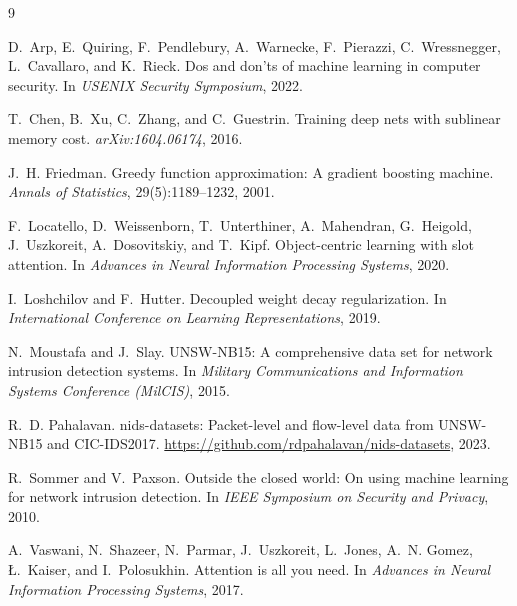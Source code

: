 \documentclass[11pt]{article}
\begin{document}

\begin{thebibliography}{9}

D.~Arp, E.~Quiring, F.~Pendlebury, A.~Warnecke, F.~Pierazzi, C.~Wressnegger,
L.~Cavallaro, and K.~Rieck.
\newblock Dos and don'ts of machine learning in computer security.
\newblock In \emph{USENIX Security Symposium}, 2022.

T.~Chen, B.~Xu, C.~Zhang, and C.~Guestrin.
\newblock Training deep nets with sublinear memory cost.
\newblock \emph{arXiv:1604.06174}, 2016.

J.~H. Friedman.
\newblock Greedy function approximation: A gradient boosting machine.
\newblock \emph{Annals of Statistics}, 29(5):1189--1232, 2001.

F.~Locatello, D.~Weissenborn, T.~Unterthiner, A.~Mahendran, G.~Heigold,
J.~Uszkoreit, A.~Dosovitskiy, and T.~Kipf.
\newblock Object-centric learning with slot attention.
\newblock In \emph{Advances in Neural Information Processing Systems}, 2020.

I.~Loshchilov and F.~Hutter.
\newblock Decoupled weight decay regularization.
\newblock In \emph{International Conference on Learning Representations}, 2019.

N.~Moustafa and J.~Slay.
\newblock UNSW-NB15: A comprehensive data set for network intrusion detection
systems.
\newblock In \emph{Military Communications and Information Systems Conference
(MilCIS)}, 2015.

R.~D. Pahalavan.
\newblock nids-datasets: Packet-level and flow-level data from UNSW-NB15 and
CIC-IDS2017.
\newblock \url{https://github.com/rdpahalavan/nids-datasets}, 2023.

R.~Sommer and V.~Paxson.
\newblock Outside the closed world: On using machine learning for network
intrusion detection.
\newblock In \emph{IEEE Symposium on Security and Privacy}, 2010.

A.~Vaswani, N.~Shazeer, N.~Parmar, J.~Uszkoreit, L.~Jones, A.~N. Gomez,
{\L}.~Kaiser, and I.~Polosukhin.
\newblock Attention is all you need.
\newblock In \emph{Advances in Neural Information Processing Systems}, 2017.

\end{thebibliography}
\end{document}
